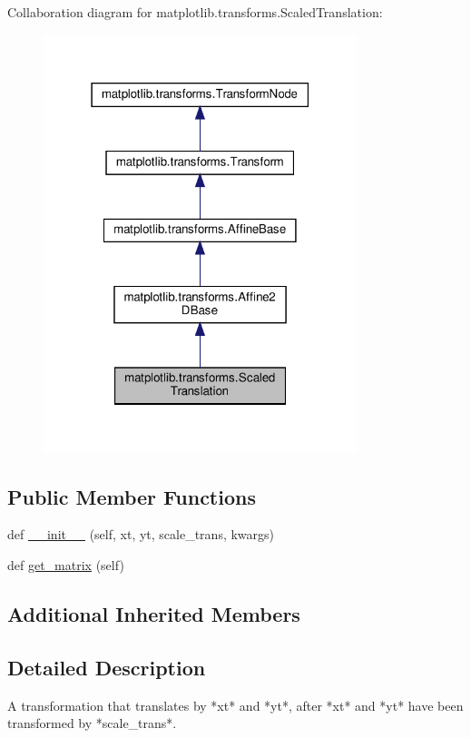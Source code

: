 Collaboration diagram for matplotlib.\+transforms.\+Scaled\+Translation\+:
\nopagebreak
\begin{figure}[H]
\begin{center}
\leavevmode
\includegraphics[width=259pt]{classmatplotlib_1_1transforms_1_1ScaledTranslation__coll__graph}
\end{center}
\end{figure}
\subsection*{Public Member Functions}
\begin{DoxyCompactItemize}
\item 
def \hyperlink{classmatplotlib_1_1transforms_1_1ScaledTranslation_a3477e23ba4b8fd47444c8f94dca035ba}{\+\_\+\+\_\+init\+\_\+\+\_\+} (self, xt, yt, scale\+\_\+trans, kwargs)
\item 
def \hyperlink{classmatplotlib_1_1transforms_1_1ScaledTranslation_ab5725291f1ed39d40bdd2c414ca01bf7}{get\+\_\+matrix} (self)
\end{DoxyCompactItemize}
\subsection*{Additional Inherited Members}


\subsection{Detailed Description}
\begin{DoxyVerb}A transformation that translates by *xt* and *yt*, after *xt* and *yt*
have been transformed by *scale_trans*.
\end{DoxyVerb}
 

